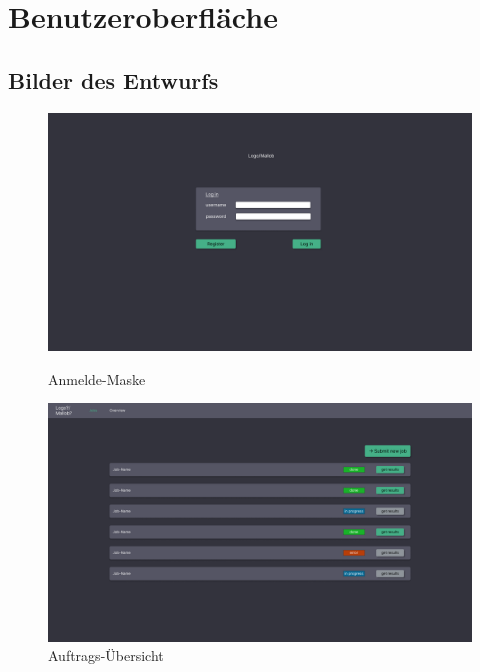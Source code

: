 \section{Benutzeroberfläche}

\subsection{Bilder des Entwurfs}
\begin{figure}[h]
    \centering

        \includegraphics[width=\textwidth]{images-interface/Loginv1.png}
        \caption{Anmelde-Maske}
        \label{fig:login}
   
        \includegraphics[width=\textwidth]{images-interface/Job-Viewv1.png}
        \caption{Auftrags-Übersicht}
        \label{fig:viewjobs}
  
\end{figure}


